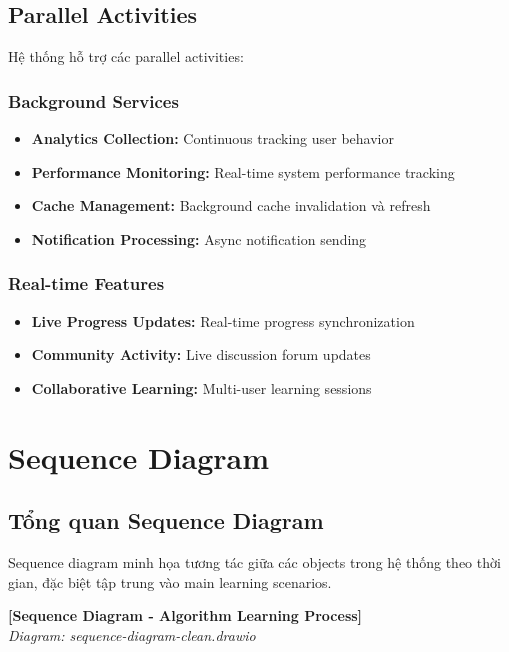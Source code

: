 \subsection{Parallel Activities}

Hệ thống hỗ trợ các parallel activities:

\subsubsection{Background Services}
\begin{itemize}
    \item \textbf{Analytics Collection:} Continuous tracking user behavior
    \item \textbf{Performance Monitoring:} Real-time system performance tracking
    \item \textbf{Cache Management:} Background cache invalidation và refresh
    \item \textbf{Notification Processing:} Async notification sending
\end{itemize}

\subsubsection{Real-time Features}
\begin{itemize}
    \item \textbf{Live Progress Updates:} Real-time progress synchronization
    \item \textbf{Community Activity:} Live discussion forum updates
    \item \textbf{Collaborative Learning:} Multi-user learning sessions
\end{itemize}

\section{Sequence Diagram}
\label{sec:sequence-diagram}

\subsection{Tổng quan Sequence Diagram}
\label{subsec:sequence-overview}

Sequence diagram minh họa tương tác giữa các objects trong hệ thống theo thời gian, đặc biệt tập trung vào main learning scenarios.

\begin{center}
\textbf{[Sequence Diagram - Algorithm Learning Process]}\\
\textit{Diagram: sequence-diagram-clean.drawio}
\end{center}

